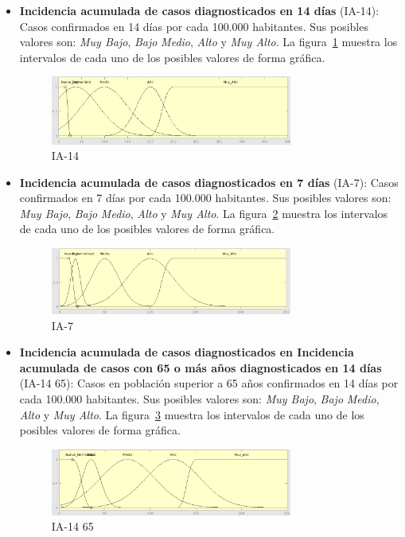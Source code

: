 \documentclass[12pt,a4paper, xcolor=table]{article}
\begin{document}
\begin{itemize}

    \item \textbf{Incidencia acumulada de casos diagnosticados en 14 días} (IA-14): Casos confirmados en 14 días por cada 100.000 habitantes. Sus posibles valores son: \textit{Muy Bajo}, \textit{Bajo} \textit{Medio}, {\textit{Alto}} y {\textit{Muy Alto}}. La figura~\ref{IA-14} muestra los intervalos de cada uno de los posibles valores de forma gráfica.

    \begin{figure}[!h]
      \centering
      \includegraphics[width=300px]{img/ia_ac_14.png}
      \caption{IA-14}
      \label{IA-14}
    \end{figure}

    \item \textbf{Incidencia acumulada de casos diagnosticados en 7 días} (IA-7): Casos confirmados en 7 días por cada 100.000 habitantes. Sus posibles valores son: \textit{Muy Bajo}, \textit{Bajo} \textit{Medio}, {\textit{Alto}} y {\textit{Muy Alto}}. La figura~\ref{IA-7} muestra los intervalos de cada uno de los posibles valores de forma gráfica.

    \begin{figure}[!h]
      \centering
      \includegraphics[width=300px]{img/ia_ac_7.png}
      \caption{IA-7}
      \label{IA-7}
    \end{figure}

    \item \textbf{Incidencia acumulada de casos diagnosticados en Incidencia acumulada de casos con 65 o más años diagnosticados en 14 días} (IA-14 65): Casos en población superior a 65 años confirmados en 14 días por cada 100.000 habitantes. Sus posibles valores son: \textit{Muy Bajo}, \textit{Bajo} \textit{Medio}, {\textit{Alto}} y {\textit{Muy Alto}}. La figura~\ref{IA-14 65} muestra los intervalos de cada uno de los posibles valores de forma gráfica.
    \newpage
    \begin{figure}[!h]
      \centering
      \includegraphics[width=300px]{img/ia_65_14.png}
      \caption{IA-14 65}
      \label{IA-14 65}
    \end{figure}


\end{itemize}
\end{document}

